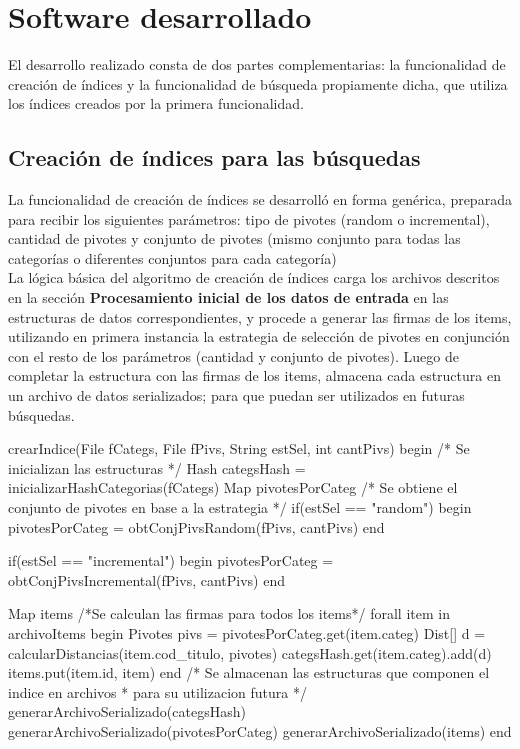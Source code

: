 \section{Software desarrollado}

El desarrollo realizado consta de dos partes complementarias: la funcionalidad de creaci\'on de \'indices y la funcionalidad de b\'usqueda propiamente dicha, que utiliza los \'indices creados por la primera funcionalidad.\\



\subsection{Creaci\'on de \'indices para las b\'usquedas}

La funcionalidad de creaci\'on de \'indices se desarroll\'o en forma gen\'erica, preparada para recibir los siguientes par\'ametros: tipo de pivotes (random o incremental), cantidad de pivotes y conjunto de pivotes (mismo conjunto para todas las categor\'ias o diferentes conjuntos para cada categor\'ia)\\

La l\'ogica b\'asica del algoritmo de creaci\'on de \'indices carga los archivos descritos en la secci\'on  \textbf{Procesamiento inicial de los datos de entrada} en las estructuras de datos correspondientes, y procede a generar las firmas de los items, utilizando en primera instancia la estrategia de selecci\'on de pivotes en conjunci\'on con el resto de los par\'ametros (cantidad y conjunto de pivotes). Luego de completar la estructura con las firmas de los items, almacena cada estructura en un archivo de datos serializados; para que puedan ser utilizados en futuras b\'usquedas.\\

\begin{algorithm}[caption={Creaci\'on de \'indice}, label={alg1}]
crearIndice(File fCategs, File fPivs, String estSel, int cantPivs)
begin
 /* Se inicializan las estructuras */
 Hash categsHash = inicializarHashCategorias(fCategs)
 Map pivotesPorCateg
 /* Se obtiene el conjunto de pivotes en base a la estrategia */
 if(estSel == "random")
 begin
  pivotesPorCateg = obtConjPivsRandom(fPivs, cantPivs)
 end

 if(estSel == "incremental")
 begin
  pivotesPorCateg = obtConjPivsIncremental(fPivs, cantPivs)
 end

 Map items
 /*Se calculan las firmas para todos los items*/
 forall item in archivoItems
 begin
  Pivotes pivs = pivotesPorCateg.get(item.categ)
  Dist[] d = calcularDistancias(item.cod_titulo, pivotes)
  categsHash.get(item.categ).add(d)
  items.put(item.id, item)
 end
 /* Se almacenan las estructuras que componen el indice en archivos 
  * para su utilizacion futura */
 generarArchivoSerializado(categsHash)
 generarArchivoSerializado(pivotesPorCateg)
 generarArchivoSerializado(items)
end
\end{algorithm}

